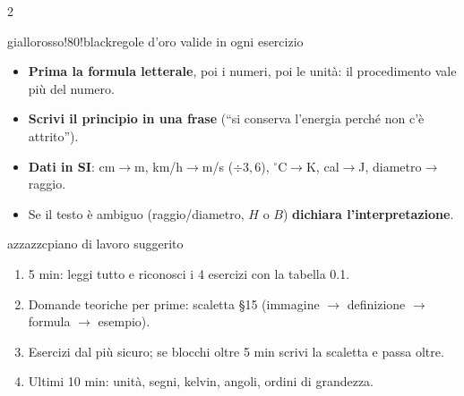 \documentclass[9pt]{extarticle}
\newenvironment{oro}[1]{\begin{bx}{giallo}{rosso!80!black}{#1}}{\end{bx}}
\begin{document}
\begin{multicols*}{2}
\begin{oro}{regole d'oro valide in ogni esercizio}
\begin{itemize}
\item \textbf{Prima la formula letterale}, poi i numeri, poi le unità: il procedimento vale più del numero.
\item \textbf{Scrivi il principio in una frase} (``si conserva l'energia perché non c'è attrito'').
\item \textbf{Dati in SI}: cm$\to$m, km/h$\to$m/s ($\div3{,}6$), $^\circ$C$\to$K, cal$\to$J, diametro$\to$raggio.
\item Se il testo è ambiguo (raggio/diametro, $H$ o $B$) \textbf{dichiara l'interpretazione}.
\end{itemize}
\end{oro}
\begin{bx}{azz}{azzc}{piano di lavoro suggerito}
\begin{enumerate}[label=\textcolor{rosso}{\bfseries\arabic*.}]
\item 5 min: leggi tutto e riconosci i 4 esercizi con la tabella 0.1.
\item Domande teoriche per prime: scaletta \S15 (immagine $\to$ definizione $\to$ formula $\to$ esempio).
\item Esercizi dal più sicuro; se blocchi oltre 5 min scrivi la scaletta e passa oltre.
\item Ultimi 10 min: unità, segni, kelvin, angoli, ordini di grandezza.
\end{enumerate}
\end{bx}


\end{multicols*}
\end{document}
